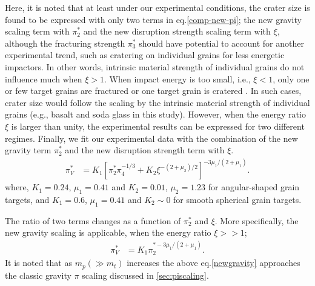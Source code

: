 \documentclass[3p,authoryear]{elsarticle}
\begin{document}
Here, it is noted that at least under our experimental conditions, the crater size is found to be expressed with only two terms in eq.\eqref{comp-new-pi}; the new gravity scaling term with $\pi_2^*$ and the new disruption strength scaling term with $\xi$, although the fracturing strength $\pi_3^*$ should have potential to account for another experimental trend, such as cratering on individual grains for less energetic impactors.
In other words, intrinsic material strength of individual grains do not influence much when $\xi>1$.
When impact energy is too small, i.e., $\xi<1$, only one or few target grains are fractured or one target grain is cratered \citep{guettler2012}.
In such cases, crater size would follow the scaling by the intrinsic material strength of individual grains (e.g., basalt and soda glass in this study).
However, when the energy ratio $\xi$ is larger than unity, the experimental results can be expressed for two different regimes. 
Finally, we fit our experimental data with the combination of the new gravity term $\pi_2^*$ and the new disruption strength term with $\xi$.
\begin{align}
	\pi_V^*&=K_1\left[\pi_2^{*}\pi_4^{-1/3}+K_2\xi^{-(2+\mu_2)/2}\right]^{-3\mu_1/(2+\mu_1)}. \label{new-pi}
\end{align}
where, $K_1=0.24 $, $\mu_1=0.41$ and $K_2=0.01$, $\mu_2=1.23$ for angular-shaped grain targets, and $K_1=0.6 $, $\mu_1=0.41$ and $K_2\sim 0$ for smooth spherical grain targets.
\begin{comment}
and in the new fracture strength regime,
\begin{align}
	\pi_V^*&=K_1K_2\xi^{3\mu_1(2+\mu_2)/2(2+\mu_1)}. \label{newstrength}
\end{align}
\end{comment}
The ratio of two terms changes as a function of $\pi_2^*$ and $\xi$. More specifically, the new gravity scaling is applicable, when the energy ratio $\xi >>1$;
\begin{align}
	\pi_V^*&=K_1\pi_2^{*-3\mu_1/(2+\mu_1)}. \label{newgravity}
\end{align}
It is noted that as $m_p(\gg m_t)$ increases the above eq.\eqref{newgravity} approaches the classic gravity $\pi$ scaling discussed in \ref{sec:piscaling}.
\end{document}
